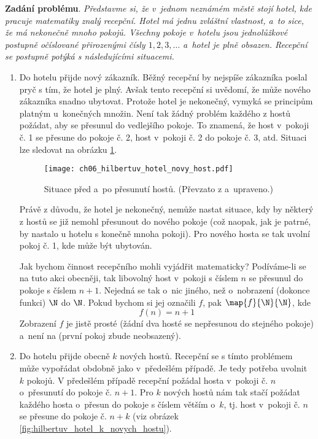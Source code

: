 \noindent\textbf{Zadání problému}. \textit{Představme si, že v~jednom neznámém městě stojí hotel, kde pracuje matematiky znalý recepční. Hotel má jednu zvláštní vlastnost, a~to sice, že má nekonečně mnoho pokojů. Všechny pokoje v~hotelu jsou jednolůžkové postupně očíslované přirozenými čísly $1,2,3,\dots$ a~hotel je plně obsazen. Recepční se postupně potýká s následujícími situacemi.}
\begin{enumerate}[label=\textit{(\roman*)}]
    \item\label{item:novy_host} Do hotelu přijde nový zákazník. Běžný recepční by nejspíše zákazníka poslal pryč s tím, že hotel je plný. Avšak tento recepční si uvědomí, že může nového zákazníka snadno ubytovat. Protože hotel je nekonečný, vymyká se principům platným u~konečných množin. Není tak žádný problém každého z hostů požádat, aby se přesunul do vedlejšího pokoje. To znamená, že host v~pokoji č. 1 se přesune do pokoje č. 2, host v~pokoji č. 2 do pokoje č. 3, atd. Situaci lze sledovat na obrázku \ref{fig:hilbertuv_hotel_novy_host}.
    \begin{figure}[h]
        \centering
        \texttt{[image: ch06\_hilbertuv\_hotel\_novy\_host.pdf]}
        \caption{Situace před a~po přesunutí hostů. (Převzato z \cite{Rmoutil2022} a~upraveno.)}
        \label{fig:hilbertuv_hotel_novy_host}
    \end{figure}
    Právě z důvodu, že hotel je nekonečný, nemůže nastat situace, kdy by některý z hostů se již nemohl přesunout do nového pokoje (což naopak, jak je patrné, by nastalo u hotelu s konečně mnoha pokoji). Pro nového hosta se tak uvolní pokoj č. 1, kde může být ubytován.\par
    Jak bychom činnost recepčního mohli vyjádřit matematicky? Podíváme-li se na tuto akci obecněji, tak libovolný host v~pokoji s číslem $n$ se přesunul do pokoje s číslem $n+1$. Nejedná se tak o~nic jiného, než o~nobrazení (dokonce funkci) $\N$ do $\N$. Pokud bychom si jej označili $f$, pak $\map{f}{\N}{\N}$, kde
    \begin{equation*}
        f(n)=n+1
    \end{equation*}
    Zobrazení $f$ je jistě prosté (žádní dva hosté se nepřesunou do stejného pokoje) a~není na (první pokoj zbude neobsazený).
    \item\label{item:k_novych_hostu} Do hotelu přijde obecně $k$ nových hostů. Recepční se s tímto problémem může vypořádat obdobně jako v~předešlém případě. Je tedy potřeba uvolnit $k$ pokojů. V předešlém případě recepční požádal hosta v~pokoji č. $n$ o~přesunutí do pokoje č. $n+1$. Pro $k$ nových hostů nám tak stačí požádat každého hosta o~přesun do pokoje s číslem větším o~$k$, tj. host v~pokoji č. $n$ se přesune do pokoje č. $n+k$ (viz obrázek \ref{fig:hilbertuv_hotel_k_novych_hostu}).

\end{enumerate}
